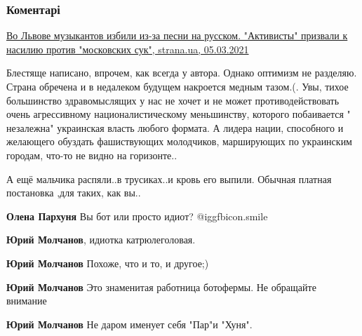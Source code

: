  
 
 
 
 
\subsubsection{Коментарі}
\label{sec:05_03_2021.fb.molchanov_jurij.1.lvov_izbienie_mova.cmt}

\begin{itemize} %

\href{https://lvov.strana.news/321171-zakon-o-jazyke-dobralsja-do-muzykantov-vo-lvove-izbili-ljudej-za-russkij-jazyk.html}{%
Во Львове музыкантов избили из-за песни на русском. "Активисты" призвали к насилию против "московских сук", %
strana.ua, 05.03.2021%
}


Блестяще написано, впрочем, как всегда у автора. Однако оптимизм не разделяю.
Страна обречена и в недалеком будущем накроется медным тазом.(. Увы, тихое
большинство здравомыслящих у нас не хочет и не может противодействовать очень
агрессивному националистическому меньшинству, которого побаивается " незалежна"
украинская власть любого формата. А лидера нации, способного и желающего
обуздать фашиствующих молодчиков, марширующих по украинским городам, что-то не
видно на горизонте..



А ещё мальчика распяли..в трусиках..и кровь его выпили.  Обычная платная
постановка ,для таких, как вы..

\begin{itemize} %
\textbf{Олена Пархуня} Вы бот или просто идиот?  @igg{fbicon.smile} 

\textbf{Юрий Молчанов}, идиотка катрюлеголовая.

\textbf{Юрий Молчанов} Похоже, что и то, и другое;)

\textbf{Юрий Молчанов} Это знаменитая работница ботофермы. Не обращайте внимание

\textbf{Юрий Молчанов} Не даром именует себя "Пар"и "Хуня".


\end{itemize}
\end{itemize}
